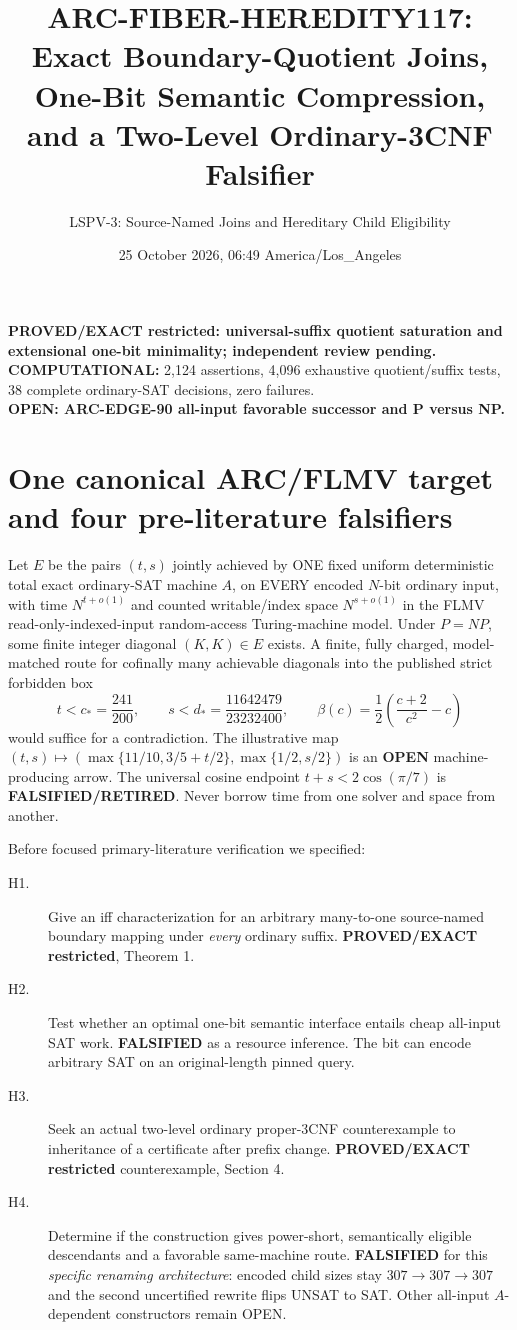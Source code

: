 \documentclass[11pt]{article}
\title{ARC-FIBER-HEREDITY117: Exact Boundary-Quotient Joins,
One-Bit Semantic Compression, and a Two-Level Ordinary-3CNF Falsifier}
\author{LSPV-3: Source-Named Joins and Hereditary Child Eligibility}
\date{25 October 2026, 06:49 America/Los\_Angeles}
\begin{document}
\maketitle
\begin{center}
\textbf{PROVED/EXACT restricted: universal-suffix quotient saturation and
extensional one-bit minimality; independent review pending.}\\
\textbf{COMPUTATIONAL:} 2,124 assertions, 4,096 exhaustive
quotient/suffix tests, 38 complete ordinary-SAT decisions, zero failures.\\
\textbf{OPEN: ARC-EDGE-90 all-input favorable successor and P versus NP.}
\end{center}

\section{One canonical ARC/FLMV target and four pre-literature falsifiers}
Let $E$ be the pairs $(t,s)$ jointly achieved by ONE fixed uniform
deterministic total exact ordinary-SAT machine $A$, on EVERY encoded
$N$-bit ordinary input, with time $N^{t+o(1)}$ and counted
writable/index space $N^{s+o(1)}$ in the FLMV read-only-indexed-input
random-access Turing-machine model. Under $P=NP$, some finite
integer diagonal $(K,K)\in E$ exists. A finite, fully charged,
model-matched route for cofinally many achievable diagonals into
the published strict forbidden box
\[
t< c_*=\frac{241}{200},\qquad
s< d_*=\frac{11642479}{23232400},\qquad
\beta(c)=\frac12\left(\frac{c+2}{c^2}-c\right)
\]
would suffice for a contradiction. The illustrative map
$(t,s)\mapsto
(\max\{11/10,3/5+t/2\},\max\{1/2,s/2\})$
is an \textbf{OPEN} machine-producing arrow. The universal cosine
endpoint $t+s<2\cos(\pi/7)$ is \textbf{FALSIFIED/RETIRED}.
Never borrow time from one solver and space from another.

Before focused primary-literature verification we specified:
\begin{description}
\item[H1.] Give an iff characterization for an arbitrary many-to-one
source-named boundary mapping under \emph{every} ordinary suffix.
\textbf{PROVED/EXACT restricted}, Theorem 1.
\item[H2.] Test whether an optimal one-bit semantic interface entails cheap
all-input SAT work. \textbf{FALSIFIED} as a resource inference.
The bit can encode arbitrary SAT on an original-length pinned query.
\item[H3.] Seek an actual two-level ordinary proper-3CNF
counterexample to inheritance of a certificate after prefix change.
\textbf{PROVED/EXACT restricted} counterexample, Section 4.
\item[H4.] Determine if the construction gives power-short,
semantically eligible descendants and a favorable same-machine route.
\textbf{FALSIFIED} for this \emph{specific renaming architecture}:
encoded child sizes stay $307\to307\to307$ and the second
uncertified rewrite flips UNSAT to SAT. Other all-input
$A$-dependent constructors remain OPEN.
\end{description}
\end{document}
